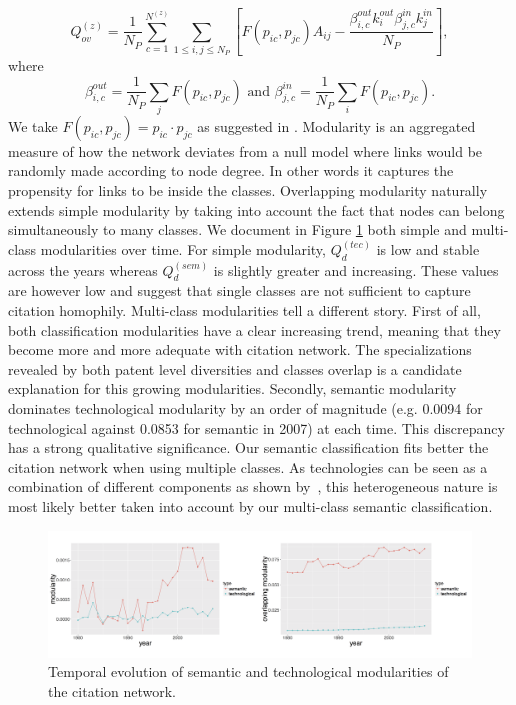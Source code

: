 \documentclass[article]{article}%
\begin{document}
\[
\displaystyle Q_{ov}^{(z)} = \frac{1}{N_P} \sum_{c = 1}^{N^{(z)}} \sum_{1\leq i,j \leq N_P}\left[F(p_{ic},p_{jc})A_{ij} - \frac{\beta_{i,c}^{out}k_i^{out}\beta_{j,c}^{in}k_j^{in}}{N_P}\right],
\]
where
\[
 \beta_{i,c}^{out} =   \frac{1}{N_P} \displaystyle \sum_j F(p_{ic},p_{jc}) \text{ and } \beta_{j,c}^{in} =  \frac{1}{N_P} \displaystyle \sum_i F(p_{ic},p_{jc}).
\]
We take $F(p_{ic},p_{jc}) = p_{ic}\cdot p_{jc}$ as suggested in \cite{nicosia2009extending}. Modularity is an aggregated measure of how the network deviates from a null model where links would be randomly made according to node degree. In other words it captures the propensity for links to be inside the classes. Overlapping modularity naturally extends simple modularity by taking into account the fact that nodes can belong simultaneously to many classes.
We document in Figure \ref{fig:modularities} both simple and multi-class modularities over time. For simple modularity, $Q_d^{(tec)}$ is low and stable across the years whereas $Q_d^{(sem)}$ is slightly greater and increasing. These values are however low and suggest that single classes are not sufficient to capture citation homophily. Multi-class modularities tell a different story. First of all, both classification modularities have a clear increasing trend, meaning that they become more and more adequate with citation network. The specializations revealed by both patent level diversities and classes overlap is a candidate explanation for this growing modularities. Secondly, semantic modularity dominates technological modularity by an order of magnitude (e.g. 0.0094 for technological against 0.0853 for semantic in 2007) at each time. This discrepancy has a strong qualitative significance. Our semantic classification fits better the citation network when using multiple classes. As technologies can be seen as a combination of different components as shown by~\cite{Youn:2015fk}, this heterogeneous nature is most likely better taken into account by our multi-class semantic classification.

\begin{figure}[!ht]
\centering
\includegraphics[width=\textwidth]{figures/Fig9}
\caption{Temporal evolution of semantic and technological modularities of the citation network.} 
\label{fig:modularities}
\end{figure}
\end{document}
